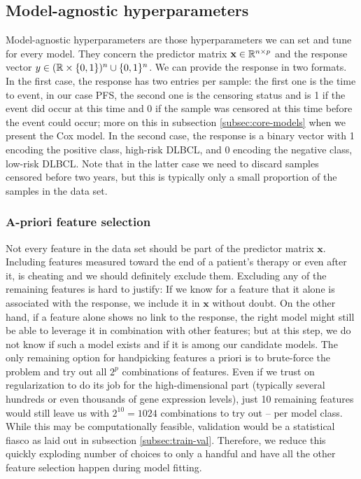 \subsection{Model-agnostic hyperparameters}\label{subsec:model-agnostic}

Model-agnostic hyperparameters are those hyperparameters we can set and tune for every model. They 
concern the predictor matrix $\mathbf{x} \in \mathbb{R}^{n \times p}$ and the response vector $y \in 
(\mathbb{R} \times \{ 0, 1 \})^n \cup \{ 0, 1 \}^n$. We can provide the response in two formats. In the 
first case, the response has two entries per sample: the first one is the time to event, in our 
case PFS, the second one is the censoring status and is 1 if the event did occur at this time and 
0 if the sample was censored at this time before the event could occur; more on this in subsection 
\ref{subsec:core-models} when we present the Cox model. In the second case, the response is a binary 
vector with 1 encoding the positive class, high-risk DLBCL,
and 0 encoding the negative class, low-risk DLBCL. Note that in the latter case we need 
to discard samples censored before two years, but this is typically only a small proportion of the 
samples in the data set.

\subsubsection{A-priori feature selection}

Not every feature in the data set should be part of the predictor matrix $\mathbf{x}$. Including 
features measured toward the end of a patient's therapy or even after it, is cheating and we 
should definitely exclude them. Excluding any of the remaining features is hard to justify: If we 
know for a feature that it alone is associated with the response, we include it in $\mathbf{x}$ 
without doubt.
On the other hand, if a feature alone shows no link to the response, the right model might still be 
able to leverage it in combination with other features; but at this step, we do not know if such 
a model exists and if it is among our candidate models. The only remaining option for handpicking 
features a priori is to brute-force the problem and try out all $2^p$ combinations of features.
Even if we trust on regularization to do its job for the high-dimensional part (typically several 
hundreds or even thousands of gene expression levels), just \num{10} remaining features would still
leave us with $2^{10} = 1024$ combinations to try out -- per model class. While this may be 
computationally feasible, validation would be a statistical fiasco as laid out in subsection 
\ref{subsec:train-val}. Therefore, we reduce this quickly exploding number of choices to only 
a handful and have all the other feature selection happen during model fitting. 

